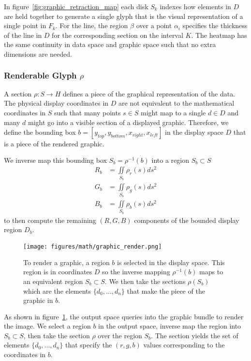 \documentclass[../main.tex]{subfiles}
\begin{document}
In figure~\ref{fig:graphic_retraction_map} each disk $S_k$ indexes how elements in $D$ are held together to generate a single glyph that is the visual representation of a single point in $F_k$. For the line, the region $\beta$ over a point $\alpha_i$ specifies the thickness of the line in $D$ for the corresponding section on the interval $K$. The heatmap has the same continuity in data space and graphic space such that no extra dimensions are needed. 

 
\subsubsection{Renderable Glyph $\rho$}
\label{sec:graphic_section}
A section $\rho: S\rightarrow H$ defines a piece of the graphical representation of the data. The physical display coordinates in $D$ are not equivalent to the mathematical coordinates in $S$ such that many points $s \in S$ might map to a single $d\in D$ and many $d$ might go into a visible section of a displayed graphic. Therefore, we define the bounding box $b=\left[y_{top}, y_{bottom}, x_{right}, x_{left}\right]$ in the display space $D$ that is a piece of the rendered graphic.  

We inverse map this bounding box $S_b =\rho^{-1}(b)$ into a region $S_b \subset S$  
\begin{align}
    R_b &= \iint\limits_{S_b} \rho_r(s)ds^{2}\\
    G_b &= \iint\limits_{S_b} \rho_g(s)ds^{2}\\
    B_b &= \iint\limits_{S_b} \rho_b(s)ds^{2}
\end{align}
to then compute the remaining $(R, G, B)$ components of the bounded display region $D_b$.

\begin{figure}
    \texttt{[image: figures/math/graphic\_render.png]}
    \caption{To render a graphic, a region $b$ is selected in the display space. This region is in coordinates $D$ so the inverse mapping $\rho^{-1}(b)$ maps to an equivalent region $S_b \subset S$. We then take the sections $\rho(S_b)$ which are the elements $\{d_0, \ldots, d_n\}$ that make the piece of the graphic in $b$.}
    \label{fig:graphic_rho_lookup}
\end{figure}
As shown in figure~\ref{fig:graphic_rho_lookup}, the output space queries into the graphic bundle to render the image. We select a region $b$ in the output space, inverse map the region into $S_b \subset S$, then take the section $\rho$ over the region $S_b$. The section yields the set of elements $\{d_0, \ldots, d_n\}$ that specify the $(r, g, b)$ values corresponding to the coordinates in $b$. 
\end{document}
